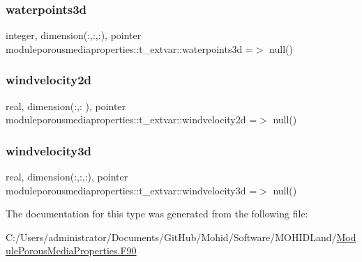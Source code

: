 \subsubsection{\texorpdfstring{waterpoints3d}{waterpoints3d}}
{\footnotesize\ttfamily integer, dimension(\+:,\+:,\+:), pointer moduleporousmediaproperties\+::t\+\_\+extvar\+::waterpoints3d =$>$ null()\hspace{0.3cm}{\ttfamily [private]}}

\mbox{\label{structmoduleporousmediaproperties_1_1t__extvar_ac3149ff55af19d8a36e05fb237b06f8f}} 
\subsubsection{\texorpdfstring{windvelocity2d}{windvelocity2d}}
{\footnotesize\ttfamily real, dimension(\+:,\+:  ), pointer moduleporousmediaproperties\+::t\+\_\+extvar\+::windvelocity2d =$>$ null()\hspace{0.3cm}{\ttfamily [private]}}

\mbox{\label{structmoduleporousmediaproperties_1_1t__extvar_a3be75db9b58faad647dcdfade10af1df}} 
\subsubsection{\texorpdfstring{windvelocity3d}{windvelocity3d}}
{\footnotesize\ttfamily real, dimension(\+:,\+:,\+:), pointer moduleporousmediaproperties\+::t\+\_\+extvar\+::windvelocity3d =$>$ null()\hspace{0.3cm}{\ttfamily [private]}}



The documentation for this type was generated from the following file\+:\begin{DoxyCompactItemize}
\item 
C\+:/\+Users/administrator/\+Documents/\+Git\+Hub/\+Mohid/\+Software/\+M\+O\+H\+I\+D\+Land/\mbox{\hyperlink{_module_porous_media_properties_8_f90}{Module\+Porous\+Media\+Properties.\+F90}}\end{DoxyCompactItemize}
